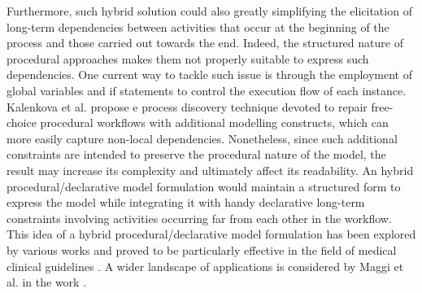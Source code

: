 Furthermore, such hybrid solution could also greatly simplifying the elicitation of long-term dependencies between activities that occur at the beginning of the process and those carried out towards the end. Indeed, the structured nature of procedural approaches makes them not properly suitable to express such dependencies.
One current way to tackle such issue is through the employment of global variables and if statements to control the execution flow of each instance.
Kalenkova et al. \cite{2020-Kalenkova} propose e process discovery technique devoted to repair free-choice procedural workflows with additional modelling constructs, which can more easily capture non-local dependencies. Nonetheless, since such additional constraints are intended to preserve the procedural nature of the model, the result may increase its complexity and ultimately affect its readability.
An hybrid procedural/declarative model formulation would maintain a structured form to express the model while integrating it with handy declarative long-term constraints involving activities occurring far from each other in the workflow.
%
%
This idea of a hybrid procedural/declarative model formulation has been explored by various works and proved to be particularly effective in the field of medical clinical guidelines \cite{2009a-Bottrighi,2009b-Bottrighi, 2011-Bottrighi}. A wider landscape of applications is considered by Maggi et al. in the work \cite{2018b-Maggi}. %

